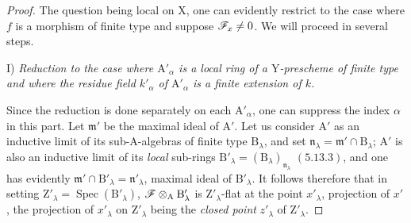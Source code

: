 \begin{proof}
The question being local on $\mathrm{X}$, one can evidently restrict to the case where $f$ is
a morphism of finite type and suppose $\mathscr{F}_x\neq 0$. We will proceed in several steps.

\medskip
\noindent I) \emph{Reduction to the case where $\mathrm{A}'_\alpha$ is a local ring of a $\mathrm{Y}$-prescheme of finite type and where the
residue field $k'_\alpha$ of $\mathrm{A}'_\alpha$ is a finite extension of $k$.}

\medskip
Since the reduction is done separately on each $\mathrm{A}'_\alpha$, one can suppress the index $\alpha$ in
this part. Let $\mathfrak{m}'$ be the maximal ideal of $\mathrm{A}'$. Let us consider $\mathrm{A}'$ as an
inductive limit of its sub-$\mathrm{A}$-algebras of finite type $\mathrm{B}_\lambda$, and set $\mathfrak{n}_\lambda=\mathfrak{m}'\cap\mathrm{B}_\lambda$; $\mathrm{A}'$ is also an
inductive limit of its \emph{local} sub-rings $\mathrm{B}'_\lambda=(\mathrm{B}_\lambda)_{\mathfrak{n}_\lambda}$ $(5.13.3)$, and one has evidently
$\mathfrak{m}'\cap\mathrm{B}'_\lambda=\mathfrak{n}'_\lambda$, maximal ideal of $\mathrm{B}'_\lambda$. It follows therefore  that in
setting $\mathrm{Z}'_\lambda=\operatorname{Spec}(\mathrm{B}'_\lambda)$, $\mathscr{F}\otimes_\mathrm{A}\mathrm{B}'_\lambda$ is $\mathrm{Z}'_\lambda$-flat at the point $x'_\lambda$, projection of $x'$, the projection
of $x'_\lambda$ on $\mathrm{Z}'_\lambda$ being the \emph{closed point} $z'_\lambda$ of $\mathrm{Z}'_\lambda$.


\end{proof}
